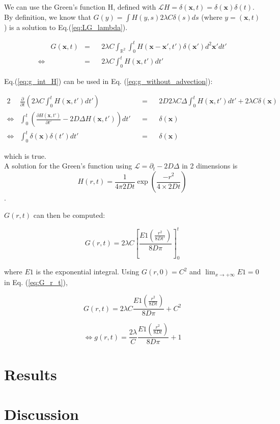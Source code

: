 We can use the Green's function H, defined with $\mathcal{L}H=\delta(\boldsymbol{x},t)=\delta(\boldsymbol{x})\delta(t)$. \\

By definition, we know that $G(y)=\int H(y,s)2\lambda C\delta(s)ds$
(where $y=(\boldsymbol{x},t)$) is a solution to Eq.(\ref{eq:LG_lambda}).

\begin{align}
 & G(\boldsymbol{x},t) & = & & 2\lambda C\int_{\mathbb{R}^{2}}\int_{0}^{t}H(\boldsymbol{x}-\boldsymbol{x}',t')\delta(\boldsymbol{x}')d^2\boldsymbol{x}'dt'\nonumber \\
\Leftrightarrow &  & = &  & 2\lambda C\int_{0}^{t}H(\boldsymbol{x},t')dt'\label{eq:g_int_H}
\end{align}

Eq.(\ref{eq:g_int_H}) can be used in Eq. (\ref{eq:g_without_advection}):

\begin{alignat*}{2}
 & \frac{\partial}{\partial t}\left(2\lambda C\int_{0}^{t}H(\boldsymbol{x},t')dt'\right) & & = & & 2D2\lambda C\Delta\int_{0}^{t}H(\boldsymbol{x},t')dt'+2\lambda C\delta(\boldsymbol{x})\\
\Leftrightarrow & \int_{0}^{t}\left(\frac{\partial H(\boldsymbol{x},t')}{\partial t'}-2D\Delta H(\boldsymbol{x},t')\right)dt' & & = & & \delta(\boldsymbol{x})\\
\Leftrightarrow & \int_{0}^{t}\delta(\boldsymbol{x})\delta(t')dt' & & = & & \delta(\boldsymbol{x})
\end{alignat*}

which is true. \\

A solution for the Green's function using $\mathcal{L}=\partial_{t}-2D\Delta$
in 2 dimensions is $$H(r,t)=\frac{1}{4\pi2Dt}\exp(\frac{-r^{2}}{4\times2Dt})$$. 

$G(r,t)$ can then be computed:

\begin{equation}
G(r,t)=2\lambda C\left[\frac{E1\left(\frac{r^{2}}{8Dt'}\right)}{8D\pi}\right]_{0}^{t}\label{eq:G_r_t}
\end{equation}

where $E1$ is the exponential integral. Using $G(r,0)=C^{2}$ and
$\lim_{x\rightarrow+\infty}E1=0$ in Eq. (\ref{eq:G_r_t}), 

\begin{equation}
G(r,t)=2\lambda C\frac{E1\left(\frac{r^{2}}{8Dt}\right)}{8D\pi}+C^{2}
\end{equation}

\begin{equation}
\Leftrightarrow g(r,t)=\frac{2\lambda}{C}\frac{E1\left(\frac{r^{2}}{8Dt}\right)}{8D\pi}+1
\end{equation}

\section*{Results}

\section*{Discussion}

